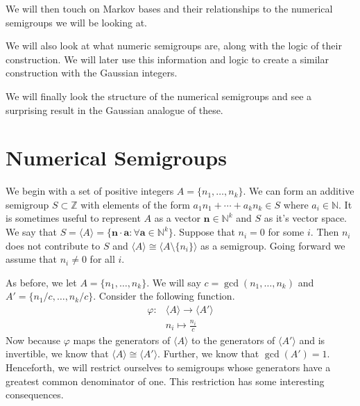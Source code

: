 \documentclass[11pt]{amsart}
\theoremstyle{plain}
\theoremstyle{definition}
\begin{document}
We will then touch on Markov bases and their relationships to the numerical
semigroups we will be looking at.

We will also look at what numeric semigroups are, along with the logic of their
construction. We will later use this information and logic to create a similar
construction with the Gaussian integers.

We will finally look the structure of the numerical semigroups and see a
surprising result in the Gaussian analogue of these.

\section{Numerical Semigroups}

We begin with a set of positive integers $A=\{n_1,\dots,n_k\}$. We can form an
additive semigroup $S\subset \mathbb{Z}$ with elements of the form
$a_1n_1+\cdots+{a_k}n_k\in S$ where $a_i\in \mathbb{N}$. It is sometimes useful
to represent $A$ as a vector $\mathbf{n}\in \mathbb{N}^k$ and $S$ as it's vector
space. We say that $S=\langle A\rangle=\{\mathbf{n}\cdot\mathbf{a}:
\forall\mathbf{a}\in \mathbb{N}^k\}$. Suppose that $n_i=0$ for some $i$.
Then $n_i$ does not contribute to $S$ and $\langle A\rangle \cong \langle
A\setminus \{n_i\}\rangle$ as a semigroup. Going forward we assume that
$n_i\ne 0$ for all $i$.

As before, we let $A=\{n_1,\dots,n_k\}$. We will say $c=\gcd(n_1,\dots,n_k)$ and
$A'=\{n_1/c,\dots,n_k/c\}$. Consider the following function.
\begin{align*}
  \varphi:&\langle A\rangle \to \langle A'\rangle\\
  &n_i\mapsto \frac{n_i}{c}
\end{align*}
Now because $\varphi$ maps the generators of $\langle A\rangle$ to the generators
of $\langle A'\rangle$ and is invertible, we know that $\langle A\rangle \cong
\langle A'\rangle $. Further, we know that $\gcd(A')=1$. Henceforth, we will
restrict ourselves to semigroups whose generators have a greatest common
denominator of one. This restriction has some interesting consequences.
\end{document}
